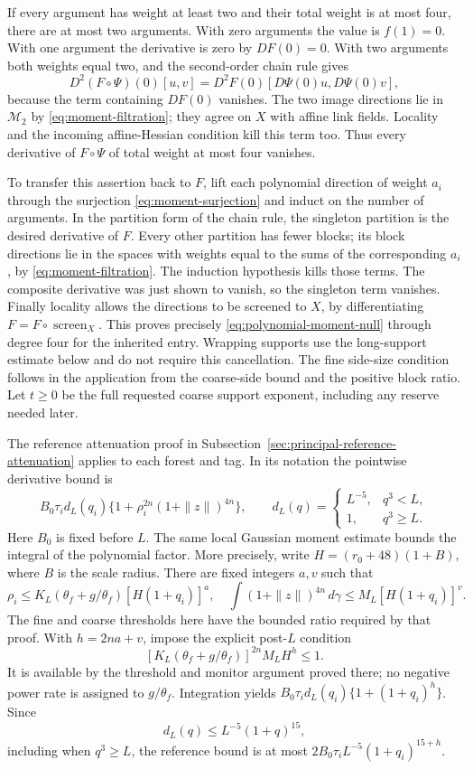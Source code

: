 If every argument has weight at least two and their total weight is
at most four, there are at most two arguments. With zero arguments
the value is $f(1)=0$. With one argument the derivative is zero by
$DF(0)=0$. With two arguments both weights equal two, and the
second-order chain rule gives
\[
 D^2(F\circ\Psi)(0)[u,v]
 =D^2F(0)[D\Psi(0)u,D\Psi(0)v],
\]
because the term containing $DF(0)$ vanishes. The two image
directions lie in $\mathcal M_2$ by \eqref{eq:moment-filtration};
they agree on $X$ with affine link fields. Locality and the
incoming affine-Hessian condition kill this term too.
Thus every derivative of $F\circ\Psi$ of total weight at most
four vanishes.

To transfer this assertion back to $F$, lift each polynomial
direction of weight $a_i$ through the surjection
\eqref{eq:moment-surjection} and induct on the number of arguments.
In the partition form of the chain rule, the singleton partition
is the desired derivative of $F$. Every other partition has fewer
blocks; its block directions lie in the spaces with weights equal
to the sums of the corresponding $a_i$, by
\eqref{eq:moment-filtration}. The induction hypothesis kills
those terms. The composite derivative was just shown to vanish,
so the singleton term vanishes. Finally locality allows the
directions to be screened to $X$, by differentiating
$F=F\circ\operatorname{screen}_X$.
This proves precisely \eqref{eq:polynomial-moment-null} through
degree four for the inherited entry. Wrapping supports use the
long-support estimate below and do not require this cancellation.
The fine side-size condition follows in the application from the
coarse-side bound and the positive block ratio.
Let $t\ge0$ be the full requested coarse
support exponent, including any reserve needed later.

The reference attenuation proof in
Subsection~\ref{sec:principal-reference-attenuation} applies to each
forest and tag. In its notation the pointwise derivative bound is
\[
 B_0\tau_i d_L(q_i)
             \{1+\rho_i^{2n}(1+\|z\|)^{4n}\},
 \qquad
 d_L(q)=\begin{cases}L^{-5},&q^3<L,\\1,&q^3\ge L.\end{cases}
\]
Here $B_0$ is fixed before $L$. The same local Gaussian moment
estimate bounds the integral of the polynomial factor. More precisely,
write $H=(r_0+48)(1+B)$, where $B$ is the scale radius. There are fixed
integers $a,v$ such that
\[
 \rho_i\le K_L(\theta_f+g/\theta_f)
                         [H(1+q_i)]^a,
 \quad
 \int(1+\|z\|)^{4n}\,d\gamma\le M_L[H(1+q_i)]^v.
\]
The fine and coarse thresholds here have the bounded ratio required
by that proof. With $h=2na+v$, impose the explicit post-$L$ condition
\[
 [K_L(\theta_f+g/\theta_f)]^{2n}M_L H^h\le1.
\]
It is available by the threshold and monitor argument proved there;
no negative power rate is assigned to $g/\theta_f$. Integration yields
$B_0\tau_i d_L(q_i)\{1+(1+q_i)^h\}$. Since
\[
 d_L(q)\le L^{-5}(1+q)^{15},
\]
including when $q^3\ge L$, the reference bound is at most
$2B_0\tau_i L^{-5}(1+q_i)^{15+h}$.

